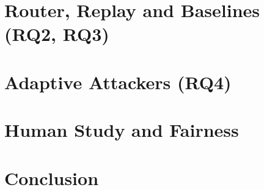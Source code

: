 \documentclass[11pt]{article}
\begin{document}
\section{Router, Replay and Baselines (RQ2, RQ3)}
\label{sec:router}

\section{Adaptive Attackers (RQ4)}
\label{sec:rq4}

\section{Human Study and Fairness}
\label{sec:human}

\section{Conclusion}
\label{sec:conclusion}
\end{document}
